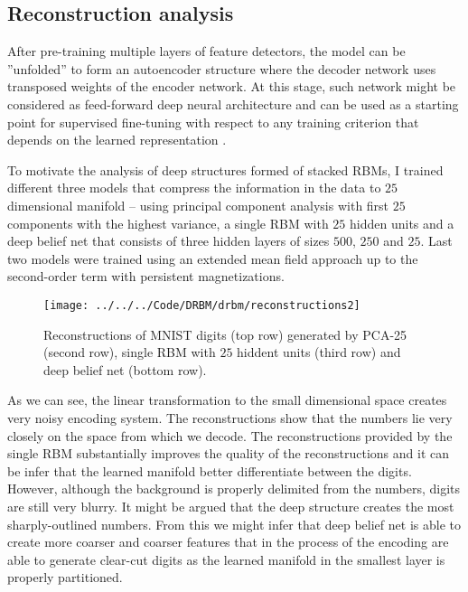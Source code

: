 \subsection{Reconstruction analysis}
After pre-training multiple layers of feature detectors, the model can be ''unfolded'' to form an autoencoder structure where the decoder network uses transposed weights of the encoder network. At this stage, such network might be considered as feed-forward deep neural architecture and can be used as a starting point for supervised fine-tuning with respect to any training criterion that depends on the learned representation \cite{bengio2007greedy}.

To motivate the analysis of deep structures formed of stacked RBMs, I trained different three models that compress the information in the data to $25$ dimensional manifold -- using principal component analysis with first $25$ components with the highest variance, a single RBM with $25$ hidden units and a deep belief net that consists of three hidden layers of sizes $500$, $250$ and $25$. Last two models were trained using an extended mean field approach up to the second-order term with persistent magnetizations.

\begin{figure}[!htb]
\texttt{[image: ../../../Code/DRBM/drbm/reconstructions2]}
  \caption[Reconstructions of digits with basic models]{Reconstructions of MNIST digits (top row) generated by PCA-25 (second row),  single RBM with $25$ hiddent units (third row) and deep belief net (bottom row).}
  \label{fig:pca}
\end{figure}
As we can see, the linear transformation to the small dimensional space creates very noisy encoding system. The reconstructions show that the numbers lie very closely on the space from which we decode. The reconstructions provided by the single RBM substantially improves the quality of the reconstructions and it can be infer that the learned manifold better differentiate between the digits. However, although the background is properly delimited from the numbers, digits are still very blurry. It might be argued that the deep structure creates the most sharply-outlined numbers. From this we might infer that deep belief net is able to create more coarser and coarser features that in the process of the encoding are able to generate clear-cut digits as the learned manifold in the smallest layer is properly partitioned.

